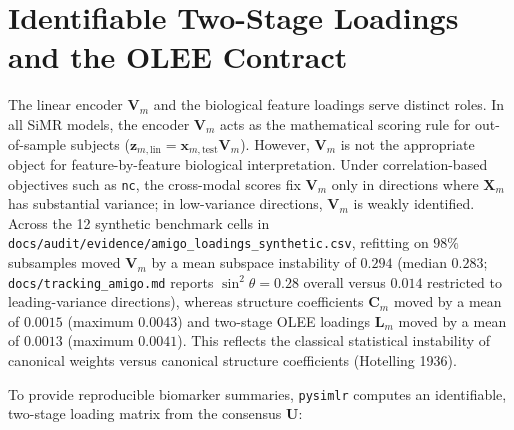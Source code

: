 \documentclass[
  10pt,
  letterpaper,
]{report}
\begin{document}
\section{Identifiable Two-Stage Loadings and the OLEE
Contract}\label{identifiable-two-stage-loadings-and-the-olee-contract}

The linear encoder \(\mathbf{V}_m\) and the biological feature loadings
serve distinct roles. In all SiMR models, the encoder \(\mathbf{V}_m\)
acts as the mathematical scoring rule for out-of-sample subjects
(\(\mathbf{z}_{m,\text{lin}} = \mathbf{x}_{m,\text{test}} \mathbf{V}_m\)).
However, \(\mathbf{V}_m\) is not the appropriate object for
feature-by-feature biological interpretation. Under correlation-based
objectives such as \texttt{nc}, the cross-modal scores fix
\(\mathbf{V}_m\) only in directions where \(\mathbf{X}_m\) has
substantial variance; in low-variance directions, \(\mathbf{V}_m\) is
weakly identified. Across the 12 synthetic benchmark cells in
\texttt{docs/audit/evidence/amigo\_loadings\_synthetic.csv}, refitting
on \(98\%\) subsamples moved \(\mathbf{V}_m\) by a mean subspace
instability of \(0.294\) (median \(0.283\);
\texttt{docs/tracking\_amigo.md} reports \(\sin^2\theta = 0.28\) overall
versus \(0.014\) restricted to leading-variance directions), whereas
structure coefficients \(\mathbf{C}_m\) moved by a mean of \(0.0015\)
(maximum \(0.0043\)) and two-stage OLEE loadings \(\mathbf{L}_m\) moved
by a mean of \(0.0013\) (maximum \(0.0041\)). This reflects the
classical statistical instability of canonical weights versus canonical
structure coefficients (Hotelling 1936).

To provide reproducible biomarker summaries, \texttt{pysimlr} computes
an identifiable, two-stage loading matrix from the consensus
\(\mathbf{U}\):
\end{document}
